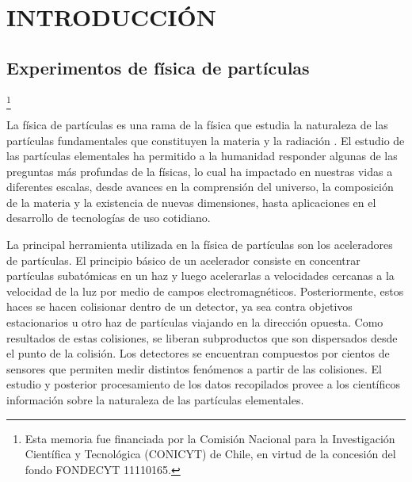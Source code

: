 \newcommand\blfootnote[1]{%
  \begingroup
  \renewcommand\thefootnote{}\footnote{#1}%
  \addtocounter{footnote}{-1}%
  \endgroup
}

\chapter{INTRODUCCIÓN}
\label{chapter:introduction}
\section{Experimentos de física de partículas}
\blfootnote{Esta memoria fue financiada por la Comisión Nacional para la Investigación Científica y Tecnológica (CONICYT) de Chile, en virtud de la concesión del fondo FONDECYT  11110165.} 


	La física de partículas es una rama de la física que estudia la naturaleza de las partículas fundamentales que constituyen la materia y la radiación \citep{wiki}. El estudio de las partículas elementales ha permitido a la humanidad responder algunas de las preguntas más profundas de la físicas, lo cual ha impactado en nuestras vidas a diferentes escalas, desde avances en la comprensión del universo, la composición de la materia y la existencia de nuevas dimensiones, hasta aplicaciones en el desarrollo de tecnologías de uso cotidiano. 

	La principal herramienta utilizada en la física de partículas son los aceleradores de partículas. El principio básico de un acelerador consiste en concentrar partículas subatómicas en un haz y luego acelerarlas a velocidades cercanas a la velocidad de la luz por medio de campos electromagnéticos. Posteriormente, estos haces se hacen colisionar dentro de un detector, ya sea contra objetivos estacionarios u otro haz de partículas viajando en la dirección opuesta.  Como resultados de estas colisiones, se liberan subproductos que son dispersados desde el punto de la colisión. Los detectores se encuentran compuestos por cientos de sensores que permiten medir distintos fenómenos a partir de las colisiones. El estudio y posterior procesamiento de los datos recopilados  provee a los científicos información sobre la naturaleza de las partículas elementales.

